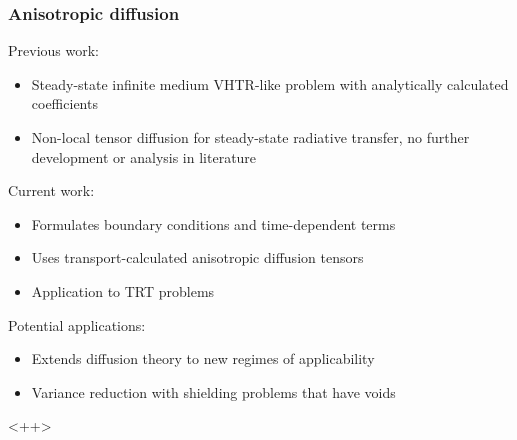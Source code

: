 \documentclass[draft]{beamer}
\begin{document}
\begin{frame}
  \frametitle{Anisotropic diffusion}
  Previous work:
  \begin{itemize}
    \item Steady-state infinite medium VHTR-like problem with analytically
      calculated coefficients \cite{Lar2009c}
    \item Non-local tensor diffusion \cite{Mor2007} for steady-state
      radiative transfer, no further development or analysis in literature
  \end{itemize}
  Current work:
  \begin{itemize}
    \item Formulates boundary conditions and time-dependent terms
    \item Uses transport-calculated anisotropic diffusion tensors
    \item Application to TRT problems
  \end{itemize}
  Potential applications:
  \begin{itemize}
    \item Extends diffusion theory to new regimes of applicability
    \item Variance reduction with shielding problems that have voids
  \end{itemize}<++>
\end{frame}

\end{document}
